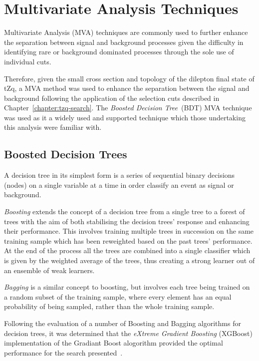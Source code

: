 \section{Multivariate Analysis Techniques}\label{sec:mvas}
Multivariate Analysis (MVA) techniques are commonly used to further enhance the separation between signal and background processes given the difficulty in identifying rare or background dominated processes through the sole use of individual cuts.

Therefore, given the small cross section and topology of the dilepton final state of tZq, a MVA method was used to enhance the separation between the signal and background following the application of the selection cuts described in Chapter~\ref{chapter:tzq-search}.
The \emph{Boosted Decision Tree}~(BDT) MVA technique was used as it a widely used and supported technique which those undertaking this analysis were familiar with.

\subsection{Boosted Decision Trees}\label{subsec:bdt}
A decision tree in its simplest form is a series of sequential binary decisions (nodes) on a single variable at a time in order classify an event as signal or background.

\emph{Boosting} extends the concept of a decision tree from a single tree to a forest of trees with the aim of both stabilising the decision trees' response and enhancing their performance.
This involves training multiple trees in succession on the same training sample which has been reweighted based on the past trees' performance.
At the end of the process all the trees are combined into a single classifier which is given by the weighted average of the trees, thus creating a strong learner out of an ensemble of weak learners.

\emph{Bagging} is a similar concept to boosting, but involves each tree being trained on a random subset of the training sample, where every element has an equal probability of being sampled, rather than the whole training sample.



Following the evaluation of a number of Boosting and Bagging algorithms for decision trees, it was determined that the \emph{eXtreme Gradient Boosting} (XGBoost) implementation of the Gradiant Boost alogorithm provided the optimal performance for the search presented~\cite{xgboost}.

